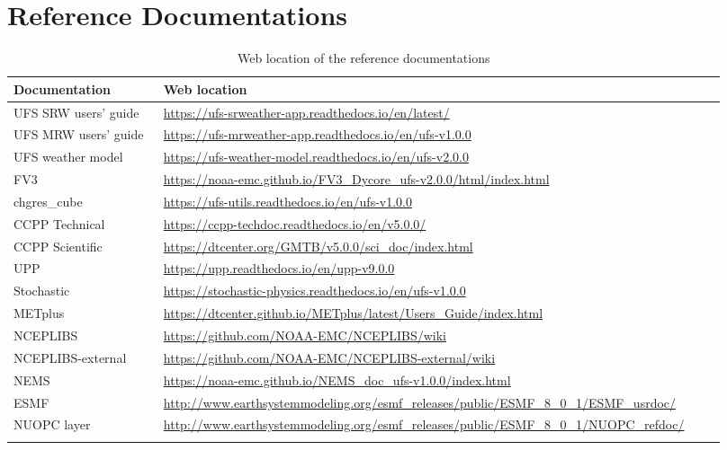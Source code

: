 \documentclass[11pt,fleqn]{report}              %
\begin{document}
\chapter{Reference Documentations}

{
\fontsize{9}{11}\selectfont
\begin{longtable}{p{0.2\linewidth} | p{0.75\linewidth} }
\hline
\hline
Documentation & Web location \\
\hline
UFS SRW users' guide &  \url{https://ufs-srweather-app.readthedocs.io/en/latest/} \\
UFS MRW users' guide & \url{https://ufs-mrweather-app.readthedocs.io/en/ufs-v1.0.0} \\
UFS weather model & \url{https://ufs-weather-model.readthedocs.io/en/ufs-v2.0.0} \\
FV3 & \url{https://noaa-emc.github.io/FV3_Dycore_ufs-v2.0.0/html/index.html} \\
chgres\_cube & \url{https://ufs-utils.readthedocs.io/en/ufs-v1.0.0} \\
CCPP Technical & \url{https://ccpp-techdoc.readthedocs.io/en/v5.0.0/} \\
CCPP Scientific & \url{https://dtcenter.org/GMTB/v5.0.0/sci_doc/index.html} \\
UPP & \url{https://upp.readthedocs.io/en/upp-v9.0.0} \\
Stochastic & \url{https://stochastic-physics.readthedocs.io/en/ufs-v1.0.0} \\
METplus & \url{https://dtcenter.github.io/METplus/latest/Users_Guide/index.html} \\
NCEPLIBS & \url{https://github.com/NOAA-EMC/NCEPLIBS/wiki} \\
NCEPLIBS-external & \url{https://github.com/NOAA-EMC/NCEPLIBS-external/wiki} \\
NEMS & \url{https://noaa-emc.github.io/NEMS_doc_ufs-v1.0.0/index.html} \\
ESMF & \url{http://www.earthsystemmodeling.org/esmf_releases/public/ESMF_8_0_1/ESMF_usrdoc/} \\
NUOPC layer & \url{http://www.earthsystemmodeling.org/esmf_releases/public/ESMF_8_0_1/NUOPC_refdoc/} \\
\hline
\caption{Web location of the reference documentations}
\label{table:ref_doc_loc}
\end{longtable}
}








\renewcommand\bibname{References}



 
\end{document}
